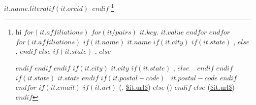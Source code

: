 $it.name.literal$$if(it.orcid)$~$endif$%
\thanks{
hi
$for(it.affiliations)$
  $for(it/pairs)$
  $it.key$. $it.value$
  $endfor$
$endfor$
$for(it.affiliations)$
  $if(it.name)$
    $it.name$%
    $if(it.city)$
      $if(it.state)$
      ,
      $else$
      ,
      $endif$
    $else$
      $if(it.state)$
      ,
      $else$

      $endif$
    $endif$
  $endif$
  $if(it.city)$
    $it.city$%
    $if(it.state)$
      ,
    $else$
    \ %
    $endif$
  $endif$
  $if(it.state)$
    $it.state$%
  $endif$
  $if(it.postal-code)$
    \ $it.postal-code$%
  $endif$
$endfor$
$if(it.email)$
$if(it.url)$
  (, \url{$it.url$})%
$else$
  ()%
$endif$
$else$
  (\url{$it.url$})%
$endif$}